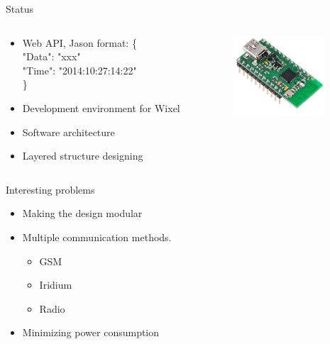 \documentclass{beamer}
\begin{document}
\begin{frame}{Status}
\begin{columns}[T] %
     \begin{column}[T]{7cm} %
		\begin{itemize}
		\item Web API, Jason format:
			\{\\
				"Data": "xxx"\\
				"Time": "2014:10:27:14:22"\\
			\}
		\item Development environment for Wixel
		\item Software architecture
		\item Layered structure designing
		\end{itemize}
	\end{column}
     \begin{column}[T]{3cm} %
          \includegraphics[height=3cm]{graphics/wixel.png}
          \cite{wixel}
     \end{column}
     \end{columns}
\end{frame}

\begin{frame}{Interesting problems}
\begin{itemize}
\item Making the design modular
\item Multiple communication methods.
	\begin{itemize}
	\item GSM
	\item Iridium
	\item Radio
	\end{itemize}
\item Minimizing power consumption
\end{itemize}
\end{frame}
\end{document}

